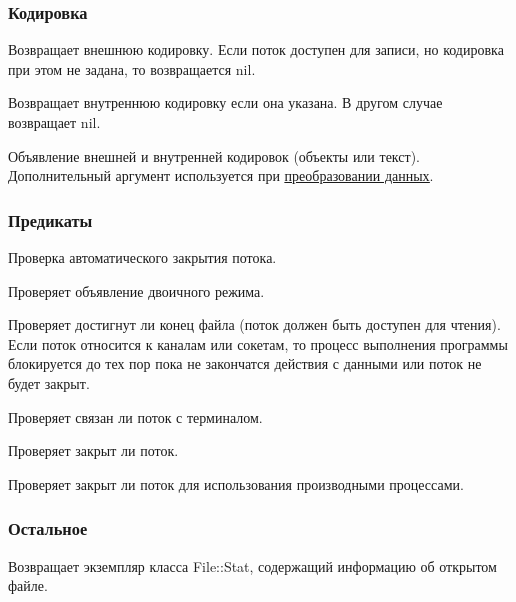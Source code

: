 \subsubsection*{Кодировка}

\begin{methodlist}
  Возвращает внешнюю кодировку. Если поток доступен для записи, но кодировка при этом не задана, то возвращается nil. 
 
  Возвращает внутреннюю кодировку если она указана. В другом случае возвращает nil. 

  Объявление внешней и внутренней кодировок (объекты или текст). Дополнительный аргумент используется при \hyperlink{appencode}{\underline{преобразовании данных}}.
\end{methodlist}

\subsubsection*{Предикаты}

\begin{methodlist}
  Проверка автоматического закрытия потока.
 
  Проверяет объявление двоичного режима. 
 
  Проверяет достигнут ли конец файла (поток должен быть доступен для чтения). Если поток относится к каналам или сокетам, то процесс выполнения программы блокируется до тех пор пока не закончатся действия с данными или поток не будет закрыт. 
 
  Проверяет связан ли поток с терминалом. 
 
  Проверяет закрыт ли поток.
 
  Проверяет закрыт ли поток для использования производными процессами. 
\end{methodlist}

\subsubsection*{Остальное}

\begin{methodlist}
  Возвращает экземпляр класса File::Stat, содержащий информацию об открытом файле. 
\end{methodlist}

